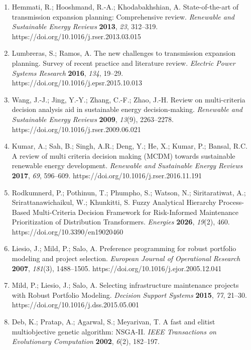 \documentclass[
  10pt,
  a4paper,
]{article}
\begin{document}
\begin{enumerate}
\def\labelenumi{\arabic{enumi}.}
\item
  Hemmati, R.; Hooshmand, R.-A.; Khodabakhshian, A. State-of-the-art of
  transmission expansion planning: Comprehensive review. \emph{Renewable
  and Sustainable Energy Reviews} \textbf{2013}, \emph{23}, 312--319.
  https://doi.org/10.1016/j.rser.2013.03.015
\item
  Lumbreras, S.; Ramos, A. The new challenges to transmission expansion
  planning. Survey of recent practice and literature review.
  \emph{Electric Power Systems Research} \textbf{2016}, \emph{134},
  19--29. https://doi.org/10.1016/j.epsr.2015.10.013
\item
  Wang, J.-J.; Jing, Y.-Y.; Zhang, C.-F.; Zhao, J.-H. Review on
  multi-criteria decision analysis aid in sustainable energy
  decision-making. \emph{Renewable and Sustainable Energy Reviews}
  \textbf{2009}, \emph{13}(9), 2263--2278.
  https://doi.org/10.1016/j.rser.2009.06.021
\item
  Kumar, A.; Sah, B.; Singh, A.R.; Deng, Y.; He, X.; Kumar, P.; Bansal,
  R.C. A review of multi criteria decision making (MCDM) towards
  sustainable renewable energy development. \emph{Renewable and
  Sustainable Energy Reviews} \textbf{2017}, \emph{69}, 596--609.
  https://doi.org/10.1016/j.rser.2016.11.191
\item
  Rodkumnerd, P.; Pothinun, T.; Phumpho, S.; Watson, N.; Siritaratiwat,
  A.; Srirattanawichaikul, W.; Khunkitti, S. Fuzzy Analytical Hierarchy
  Process-Based Multi-Criteria Decision Framework for Risk-Informed
  Maintenance Prioritization of Distribution Transformers.
  \emph{Energies} \textbf{2026}, \emph{19}(2), 460.
  https://doi.org/10.3390/en19020460
\item
  Liesio, J.; Mild, P.; Salo, A. Preference programming for robust
  portfolio modeling and project selection. \emph{European Journal of
  Operational Research} \textbf{2007}, \emph{181}(3), 1488--1505.
  https://doi.org/10.1016/j.ejor.2005.12.041
\item
  Mild, P.; Liesio, J.; Salo, A. Selecting infrastructure maintenance
  projects with Robust Portfolio Modeling. \emph{Decision Support
  Systems} \textbf{2015}, \emph{77}, 21--30.
  https://doi.org/10.1016/j.dss.2015.05.001
\item
  Deb, K.; Pratap, A.; Agarwal, S.; Meyarivan, T. A fast and elitist
  multiobjective genetic algorithm: NSGA-II. \emph{IEEE Transactions on
  Evolutionary Computation} \textbf{2002}, \emph{6}(2), 182--197.

\end{enumerate}
\end{document}

